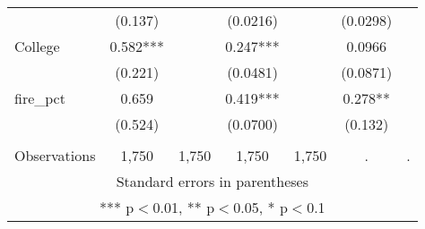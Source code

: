 \begin{tabular}{lcccccc}
 & (0.137) &  & (0.0216) &  & (0.0298) &  \\
College & 0.582*** &  & 0.247*** &  & 0.0966 &  \\
 & (0.221) &  & (0.0481) &  & (0.0871) &  \\
fire\_pct & 0.659 &  & 0.419*** &  & 0.278** &  \\
 & (0.524) &  & (0.0700) &  & (0.132) &  \\
 &  &  &  &  &  &  \\
 Observations & 1,750 & 1,750 & 1,750 & 1,750 & . & . \\ \hline
\multicolumn{7}{c}{ Standard errors in parentheses} \\
\multicolumn{7}{c}{ *** p$<$0.01, ** p$<$0.05, * p$<$0.1} \\
\end{tabular}
